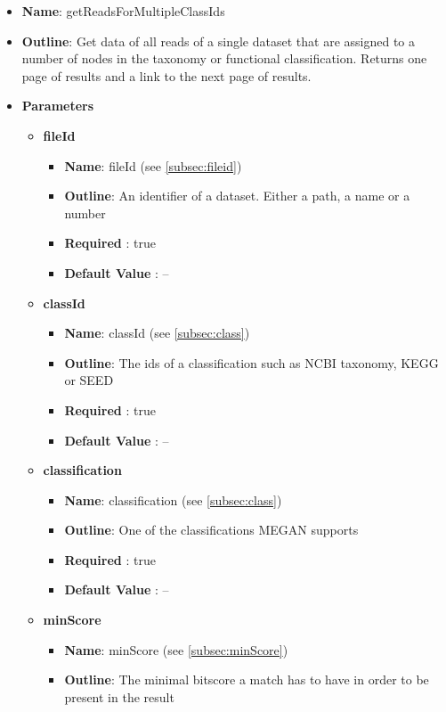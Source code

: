 \documentclass[11pt]{article}
\begin{document}
\begin{itemize}
	\item \textbf{Name}: getReadsForMultipleClassIds
	\item \textbf{Outline}: Get data of all reads of a single dataset that are assigned to a number of nodes in the taxonomy or functional classification. Returns one page of results and a link to the next page of results.
	\item \textbf{Parameters}
		\begin{itemize}
			\item \textbf{fileId}
				\begin{itemize}
					\item \textbf{Name}: fileId (see \ref{subsec:fileid})
					\item \textbf{Outline}: An identifier of a dataset. Either a path, a name or a number
					\item \textbf{Required} : true
					\item \textbf{Default Value} : --
				\end{itemize}
			\item \textbf{classId}
				\begin{itemize}
					\item \textbf{Name}: classId (see \ref{subsec:class})
					\item \textbf{Outline}: The ids of a classification such as NCBI taxonomy, KEGG or SEED
					\item \textbf{Required} : true
					\item \textbf{Default Value} : --
				\end{itemize}
			\item \textbf{classification}
				\begin{itemize}
					\item \textbf{Name}: classification (see \ref{subsec:class})
					\item \textbf{Outline}: One of the classifications MEGAN supports
					\item \textbf{Required} : true
					\item \textbf{Default Value} : --
				\end{itemize}
			\item \textbf{minScore}
				\begin{itemize}
					\item \textbf{Name}: minScore (see \ref{subsec:minScore})
					\item \textbf{Outline}: The minimal bitscore a match has to have in order to be present in the result

\end{itemize}
\end{itemize}
\end{itemize}
\end{document}
